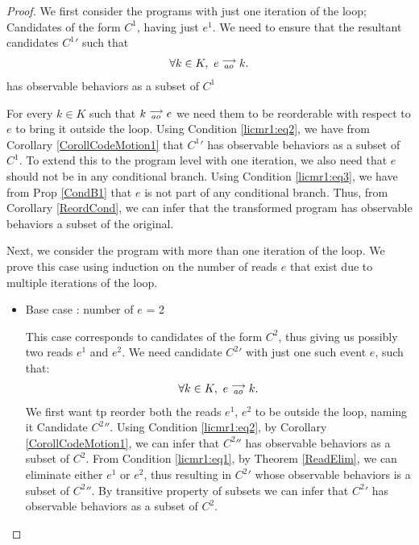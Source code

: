 \begin{proof}

    We first consider the programs with just one iteration of the loop; Candidates of the form $C^1$, having just $e^1$. 
    We need to ensure that the resultant candidates $C^1'$ such that 
    \begin{align*}
        \forall k \in K, \ e\stackrel{\longrightarrow}{_{ao}}k.
    \end{align*}  
    has observable behaviors as a subset of $C^1$

    For every $k \in K$ such that $k\stackrel{\longrightarrow}{_{ao}}e$ we need them to be reorderable with respect to $e$ to bring it outside the loop.
    Using Condition \ref{licmr1:eq2}, we have from Corollary \ref{CorollCodeMotion1} that $C^1'$ has observable behaviors as a subset of $C^1$.
    To extend this to the program level with one iteration, we also need that $e$ should not be in any conditional branch.
    Using Condition \ref{licmr1:eq3}, we have from Prop \ref{CondB1} that $e$ is not part of any conditional branch.
    Thus, from Corollary \ref{ReordCond}, we can infer that the transformed program has observable behaviors a subset of the original.  
    
    Next, we consider the program with more than one iteration of the loop. 
    We prove this case using induction on the number of reads $e$ that exist due to multiple iterations of the loop. 
    \begin{itemize}

        \item Base case : number of $e$ = 2
    
        This case corresponds to candidates of the form $C^2$, thus giving us possibly two reads $e^1$ and $e^2$.
        We need candidate $C^2'$ with just one such event $e$, such that:
        \begin{align*}
            \forall k \in K, \ e\stackrel{\longrightarrow}{_{ao}}k.
        \end{align*}
        We first want tp reorder both the reads $e^1$, $e^2$ to be outside the loop, naming it Candidate $C^2''$.
        Using Condition \ref{licmr1:eq2}, by Corollary \ref{CorollCodeMotion1}, we can infer that $C^2''$ has observable behaviors as a subset of $C^2$. 
        From Condition \ref{licmr1:eq1}, by Theorem \ref{ReadElim}, we can eliminate either $e^1$ or $e^2$, thus resulting in $C^2'$ whose observable behaviors is a subset of $C^2''$.
        By transitive property of subsets we can infer that $C^2'$ has observable behaviors as a subset of $C^2$.
        

\end{itemize}
\end{proof}
